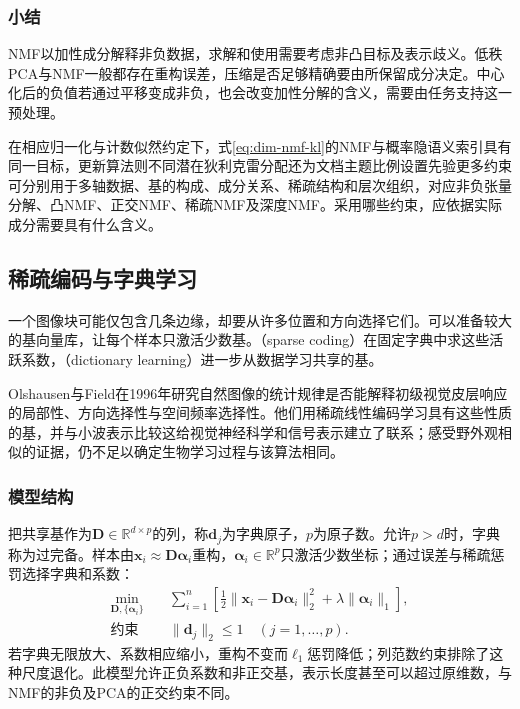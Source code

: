 \subsubsection{小结}
\label{sec:dim-nmf-summary}

NMF以加性成分解释非负数据，求解和使用需要考虑非凸目标及表示歧义。低秩PCA与NMF一般都存在重构误差，压缩是否足够精确要由所保留成分决定。中心化后的负值若通过平移变成非负，也会改变加性分解的含义，需要由任务支持这一预处理。

在相应归一化与计数似然约定下，式\eqref{eq:dim-nmf-kl}的NMF与概率隐语义索引具有同一目标，更新算法则不同潜在狄利克雷分配还为文档主题比例设置先验更多约束可分别用于多轴数据、基的构成、成分关系、稀疏结构和层次组织，对应非负张量分解、凸NMF、正交NMF、稀疏NMF及深度NMF。采用哪些约束，应依据实际成分需要具有什么含义。

\subsection{稀疏编码与字典学习}
\label{sec:dim-sparse-coding}

一个图像块可能仅包含几条边缘，却要从许多位置和方向选择它们。可以准备较大的基向量库，让每个样本只激活少数基。（sparse coding）在固定字典中求这些活跃系数，（dictionary learning）进一步从数据学习共享的基。

Olshausen与Field在1996年研究自然图像的统计规律是否能解释初级视觉皮层响应的局部性、方向选择性与空间频率选择性。他们用稀疏线性编码学习具有这些性质的基，并与小波表示比较这给视觉神经科学和信号表示建立了联系；感受野外观相似的证据，仍不足以确定生物学习过程与该算法相同。

\subsubsection{模型结构}
\label{sec:dim-sparse-coding-structure}

把共享基作为$\bm{D}\in\mathbb{R}^{d\times p}$的列，称$\bm{d}_j$为字典原子，$p$为原子数。允许$p>d$时，字典称为过完备。样本由$\bm{x}_i\approx\bm{D}\bm{\alpha}_i$重构，$\bm{\alpha}_i\in\mathbb{R}^{p}$只激活少数坐标；通过误差与稀疏惩罚选择字典和系数：
\begin{equation}
  \begin{aligned}
  \min_{\bm{D},\{\bm{\alpha}_i\}}\quad&
   \sum_{i=1}^{n}\left[
      \tfrac12\lVert\bm{x}_i-\bm{D}\bm{\alpha}_i\rVert_2^2
      +\lambda\lVert\bm{\alpha}_i\rVert_1\right],\\
  \text{约束}\quad&\lVert\bm{d}_j\rVert_2\leq1
                 \quad(j=1,\ldots,p).
  \end{aligned}
  \label{eq:dim-dictionary-objective}
\end{equation}
若字典无限放大、系数相应缩小，重构不变而$\ell_1$惩罚降低；列范数约束排除了这种尺度退化。此模型允许正负系数和非正交基，表示长度甚至可以超过原维数，与NMF的非负及PCA的正交约束不同。

